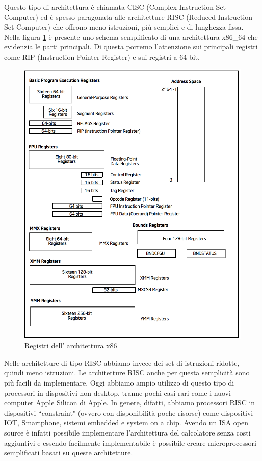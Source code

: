 \newline
Questo tipo di architettura è chiamata CISC (Complex Instruction Set Computer) ed è spesso paragonata alle architetture RISC (Reduced Instruction Set Computer) che offrono meno istruzioni, più semplici e di lunghezza fissa.\\
\newline
Nella figura \ref{fig:x86_64arch} è presente uno schema semplificato di una architettura x86\_64 che evidenzia le parti principali. Di questa porremo l'attenzione sui principali registri come RIP (Instruction Pointer Register) e sui registri a 64 bit.
\vspace{1cm}
\FloatBarrier
\begin{figure}[!htbp] 
    \centering
    \includegraphics[scale=0.8]{images/x86-64-arch.png}
    \caption{Registri dell' architettura x86}
    \label{fig:x86_64arch}
\end{figure}
\FloatBarrier
\vspace{1cm}
Nelle architetture di tipo RISC abbiamo invece dei set di istruzioni ridotte, quindi meno istruzioni. Le architetture RISC anche per questa semplicità sono più facili da implementare. Oggi abbiamo ampio utilizzo di questo tipo di processori in dispositivi non-desktop, tranne pochi casi rari come i nuovi computer Apple Silicon \cite{Apple} di Apple. In genere, difatti, abbiamo processori RISC in dispositivi ``constraint" (ovvero con disponibilità poche risorse) come dispositivi IOT, Smartphone, sistemi embedded e system on a chip. Avendo un ISA open source è infatti possibile implementare l'architettura del calcolatore senza costi aggiuntivi e essendo facilmente implementabile è possibile creare microprocessori semplificati basati su queste architetture. \\
